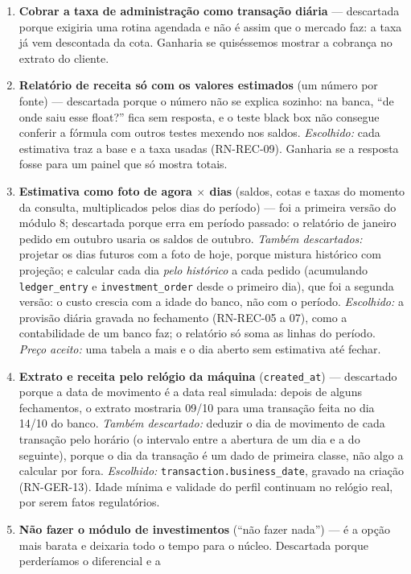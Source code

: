 \documentclass[11pt,a4paper]{article}
\newcommand{\tb}[1]{\texttt{#1}}           %
\begin{document}
\begin{enumerate}
  acumular a tarifa e creditá-la no fechamento do dia.
  \item \textbf{Cobrar a taxa de administração como transação diária} --- descartada porque exigiria
  uma rotina agendada e não é assim que o mercado faz: a taxa já vem descontada da cota. Ganharia se
  quiséssemos mostrar a cobrança no extrato do cliente.
  \item \textbf{Relatório de receita só com os valores estimados} (um número por fonte) ---
  descartada porque o número não se explica sozinho: na banca, ``de onde saiu esse float?'' fica sem
  resposta, e o teste black box não consegue conferir a fórmula com outros testes mexendo nos saldos.
  \emph{Escolhido:} cada estimativa traz a base e a taxa usadas (RN-REC-09). Ganharia se a resposta
  fosse para um painel que só mostra totais.
  \item \textbf{Estimativa como foto de agora $\times$ dias} (saldos, cotas e taxas do momento da
  consulta, multiplicados pelos dias do período) --- foi a primeira versão do módulo 8; descartada
  porque erra em período passado: o relatório de janeiro pedido em outubro usaria os saldos de
  outubro. \emph{Também descartados:} projetar os dias futuros com a foto de hoje, porque mistura
  histórico com projeção; e calcular cada dia \emph{pelo histórico} a cada pedido (acumulando
  \tb{ledger_entry} e \tb{investment_order} desde o primeiro dia), que foi a segunda versão: o custo
  crescia com a idade do banco, não com o período. \emph{Escolhido:} a provisão diária gravada no
  fechamento (RN-REC-05 a 07), como a contabilidade de um banco faz; o relatório só soma as linhas do
  período. \emph{Preço aceito:} uma tabela a mais e o dia aberto sem estimativa até fechar.
  \item \textbf{Extrato e receita pelo relógio da máquina} (\tb{created_at}) --- descartado porque a
  data de movimento é a data real simulada: depois de alguns fechamentos, o extrato mostraria 09/10
  para uma transação feita no dia 14/10 do banco. \emph{Também descartado:} deduzir o dia de movimento
  de cada transação pelo horário (o intervalo entre a abertura de um dia e a do seguinte), porque o
  dia da transação é um dado de primeira classe, não algo a calcular por fora. \emph{Escolhido:}
  \tb{transaction.business_date}, gravado na criação (RN-GER-13). Idade mínima e validade do perfil
  continuam no relógio real, por serem fatos regulatórios.
  \item \textbf{Não fazer o módulo de investimentos} (``não fazer nada'') --- é a opção mais
  barata e deixaria todo o tempo para o núcleo. Descartada porque perderíamos o diferencial e a

\end{enumerate}
\end{document}
